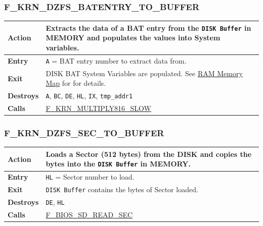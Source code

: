 \documentclass[a4paper,11pt]{article}
\begin{document}
        \subsubsection{F\_KRN\_DZFS\_BATENTRY\_TO\_BUFFER}
        \label{func:fkrndzfsbatentrytobuffer}
        \begin{tabular}{l p{9cm}}
            \hline\textbf{Action}
            & Extracts the data of a BAT entry from the \texttt{DISK Buffer}
            in \textbf{MEMORY} and populates the values into System variables.\\
            \hline\textbf{Entry} & \texttt{A} = BAT entry number to extract data
            from.\\
            \hline\textbf{Exit} & DISK BAT System Variables are populated. See
            \hyperref[sec:ram_memmap]{RAM Memory Map} for for details.\\
            \hline\textbf{Destroys} & \texttt{A}, \texttt{BC}, \texttt{DE}, 
            \texttt{HL}, \texttt{IX}, \texttt{tmp\_addr1} \\
            \hline\textbf{Calls}
            & \hyperref[func:fkrnmultiply816slow]{F\_KRN\_MULTIPLY816\_SLOW}\\
            \hline
        \end{tabular}

        \subsubsection{F\_KRN\_DZFS\_SEC\_TO\_BUFFER}
        \label{func:fkrndzfssectobuffer}
        \begin{tabular}{l p{9cm}}
            \hline\textbf{Action}
            & Loads a Sector (512 bytes) from the \textbf{DISK} and copies the
            bytes into the \texttt{DISK Buffer} in \textbf{MEMORY}.\\
            \hline\textbf{Entry} & \texttt{HL} = Sector number to load.\\
            \hline\textbf{Exit} & \texttt{DISK Buffer} contains the bytes 
            of Sector loaded.\\
            \hline\textbf{Destroys} & \texttt{DE}, \texttt{HL} \\
            \hline\textbf{Calls}
            & \hyperref[func:fbiosdiskreadsec]{F\_BIOS\_SD\_READ\_SEC}\\
            \hline
        \end{tabular}
\end{document}
